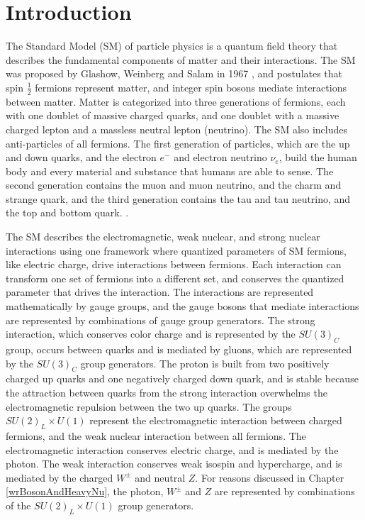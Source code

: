 \chapter{Introduction}
\label{intro_chapter}
The Standard Model (SM) of particle physics is a quantum field theory that describes the fundamental 
components of matter and their interactions.  The SM was proposed by Glashow, Weinberg and Salam in 
1967 \cite{weinbergSM,salamSM}, and postulates that spin $\frac{1}{2}$ fermions represent matter, and 
integer spin bosons mediate interactions between matter.  Matter is categorized into three generations 
of fermions, each with one doublet of massive charged quarks, and one doublet with a massive charged 
lepton and a massless neutral lepton (neutrino).  The SM also includes anti-particles of all fermions.  
The first generation of particles, which are the up and down quarks, and the electron $e^{-}$ and electron 
neutrino $\nu_{e}$, build the human body and every material and substance that humans are able to sense.  
The second generation contains the muon and muon neutrino, and the charm and strange quark, and the 
third generation contains the tau and tau neutrino, and the top and bottom quark.  .

The SM describes the electromagnetic, weak nuclear, and strong nuclear interactions using one framework 
where quantized parameters of SM fermions, like electric charge, drive interactions between fermions.  
Each interaction can transform one set of fermions into a different set, and conserves the quantized 
parameter that drives the interaction.  The interactions are represented mathematically by gauge groups, and the 
gauge bosons that mediate interactions are represented by combinations of gauge group 
generators.  The strong interaction, which conserves color charge and is represented by the $SU(3)_{C}$ 
group, occurs between quarks and is mediated by gluons, which are represented by the $SU(3)_{C}$ group 
generators.  The proton is built from two positively charged up quarks and one negatively charged down 
quark, and is stable because the attraction between quarks from the strong interaction overwhelms the 
electromagnetic repulsion between the two up quarks.  The groups $SU(2)_{L} \times U(1)$ represent the 
electromagnetic interaction between charged fermions, and the weak nuclear interaction between all fermions.  
The electromagnetic interaction conserves electric charge, and is mediated by the photon.  The weak 
interaction conserves weak isospin and hypercharge, and is mediated by the charged $W^{\pm}$ and neutral 
$Z$.  For reasons discussed in Chapter \ref{wrBosonAndHeavyNu}, the photon, $W^{\pm}$ and $Z$ are 
represented by combinations of the $SU(2)_{L} \times U(1)$ group generators.

